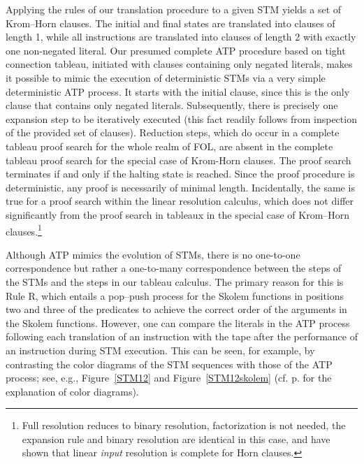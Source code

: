 \documentclass[%
  manuscript=article,   %
  year=2024,
  volume=77,
  doi=00000.000,
]{zfn}
\begin{document}
Applying the rules of our translation procedure to a given STM yields a set of Krom--Horn clauses. The initial and final states are translated into clauses of length 1, while all instructions are translated into clauses of length 2 with exactly one non-negated literal. Our presumed complete ATP procedure based on tight connection tableau, initiated with clauses containing only negated literals, makes it possible to mimic the execution of deterministic STMs via a very simple deterministic ATP process. It starts with the initial clause, since this is the only clause that contains only negated literals. Subsequently, there is precisely one expansion step to be iteratively executed (this fact readily follows from inspection of the provided set of clauses).
Reduction steps, which do occur in a complete tableau proof search for the whole realm of FOL, are absent in the complete tableau proof search for the special case of Krom-Horn clauses.
The proof search terminates if and only if the halting state is reached. Since the proof procedure is deterministic, any proof is necessarily of minimal length. Incidentally, the same is true for a proof search within the linear resolution calculus, which does not differ significantly from the proof search in tableaux in the special case of Krom--Horn clauses.\footnote{Full resolution reduces to binary resolution, factorization is not needed, the expansion rule and binary resolution are identical in this case, and \parencite{Henschen} have shown that linear \emph{input} \label{resolu} resolution is complete for Horn clauses.}

Although ATP mimics the evolution of STMs, there is no one-to-one correspondence but rather a one-to-many correspondence between the steps of the STMs and the steps in our tableau calculus. The primary reason for this is Rule R, which entails a pop--push process for the Skolem functions in positions two and three of the predicates to achieve the correct order of the arguments in the Skolem functions.
However, one can compare the literals in the ATP process following each translation of an instruction with the tape after the performance of an instruction during STM execution. This can be seen, for example, by contrasting the color diagrams of the STM sequences with those of the ATP process; see, e.g.,
Figure~\ref{STM12} and Figure~\ref{STM12skolem} (cf. p. \pageref{colordia} for the explanation of color diagrams).
\end{document}
